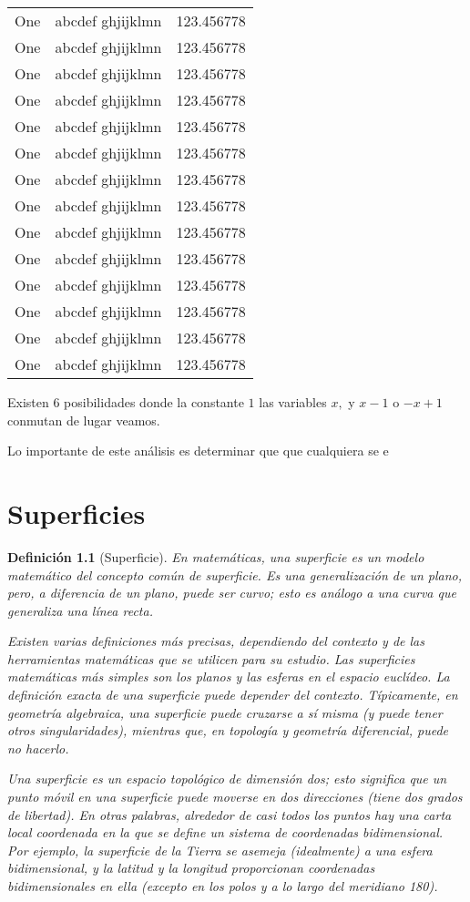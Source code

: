 \documentclass[a4paper]{book}
\newtheorem{defn}[thm]{Definición}
\begin{document}
\begin{longtable}{|l|l|l|}
	One & abcdef ghjijklmn & 123.456778 \\
	One & abcdef ghjijklmn & 123.456778 \\
	One & abcdef ghjijklmn & 123.456778 \\
	One & abcdef ghjijklmn & 123.456778 \\
	One & abcdef ghjijklmn & 123.456778 \\
	One & abcdef ghjijklmn & 123.456778 \\
	One & abcdef ghjijklmn & 123.456778 \\
	One & abcdef ghjijklmn & 123.456778 \\
	One & abcdef ghjijklmn & 123.456778 \\
	One & abcdef ghjijklmn & 123.456778 \\
	One & abcdef ghjijklmn & 123.456778 \\
	One & abcdef ghjijklmn & 123.456778 \\
	One & abcdef ghjijklmn & 123.456778 \\
	One & abcdef ghjijklmn & 123.456778 \\
\end{longtable}





Existen 6 posibilidades donde la constante $1$ las variables $x,$ y $x-1$ o $-x+1$ conmutan de lugar veamos.

Lo importante de este análisis es determinar que que cualquiera se e


\chapter{Superficies}


\begin{defn}[Superficie]
En matemáticas, una superficie es un modelo matemático del concepto común de superficie. Es una generalización de un plano, pero, a diferencia de un plano, puede ser curvo; esto es análogo a una curva que generaliza una línea recta.

Existen varias definiciones más precisas, dependiendo del contexto y de las herramientas matemáticas que se utilicen para su estudio. Las superficies matemáticas más simples son los planos y las esferas en el espacio euclídeo. La definición exacta de una superficie puede depender del contexto. Típicamente, en geometría algebraica, una superficie puede cruzarse a sí misma (y puede tener otros singularidades), mientras que, en topología y geometría diferencial, puede no hacerlo.

Una superficie es un espacio topológico de dimensión dos; esto significa que un punto móvil en una superficie puede moverse en dos direcciones (tiene dos grados de libertad). En otras palabras, alrededor de casi todos los puntos hay una carta local coordenada en la que se define un sistema de coordenadas bidimensional. Por ejemplo, la superficie de la Tierra se asemeja (idealmente) a una esfera bidimensional, y la latitud y la longitud proporcionan coordenadas bidimensionales en ella (excepto en los polos y a lo largo del meridiano 180).
\end{defn}
\end{document}
